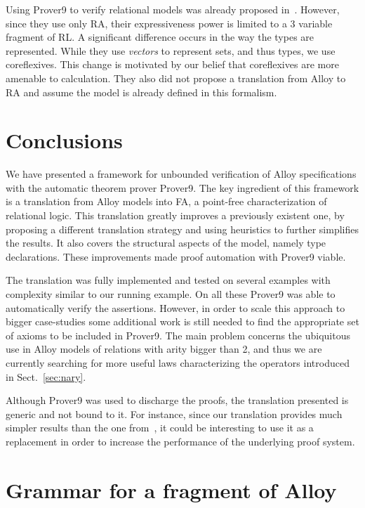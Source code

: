 \documentclass{llncs}
\begin{document}
Using Prover9 to verify relational models was already proposed in~\cite{crp9}. However, since they use only RA, their expressiveness power is limited to a 3 variable fragment of RL. A significant difference occurs in the way the types are represented. While they use \emph{vectors} to represent sets, and thus types, we use coreflexives. This change is motivated by our belief that coreflexives are more amenable to calculation. They also did not propose a translation from Alloy to RA and assume the model is already defined in this formalism. 

\section{Conclusions}
\label{sec:conc}

We have presented a framework for unbounded verification of Alloy
specifications with the automatic theorem prover Prover9. The key
ingredient of this framework is a translation from Alloy models into
FA, a point-free characterization of relational logic. This
translation greatly improves a previously existent one, by proposing a
different translation strategy and using heuristics to further
simplifies the results. It also covers the structural aspects of the
model, namely type declarations. These improvements made proof automation
with Prover9 viable.

The translation was fully implemented and tested on several examples
with complexity similar to our running example. On all these Prover9
was able to automatically verify the assertions. However, in order to
scale this approach to bigger case-studies some additional work is
still needed to find the appropriate set of axioms to be included in
Prover9. The main problem concerns the ubiquitous use in Alloy models
of relations with arity bigger than 2, and thus we are currently
searching for more useful laws characterizing the operators introduced
in Sect.~\ref{sec:nary}.

Although Prover9 was used to discharge the proofs, the translation presented is generic and not bound to it. For instance, since our translation provides much simpler results than the one from~\cite{eqalloy}, it could be interesting to use it as a replacement in order to increase the performance of the underlying proof system.






\appendix

\section{Grammar for a fragment of Alloy}
\label{sec:alloysyntax}
\end{document}
